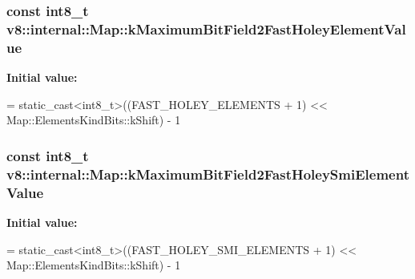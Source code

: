 \subsubsection[{k\+Maximum\+Bit\+Field2\+Fast\+Holey\+Element\+Value}]{\setlength{\rightskip}{0pt plus 5cm}const int8\+\_\+t v8\+::internal\+::\+Map\+::k\+Maximum\+Bit\+Field2\+Fast\+Holey\+Element\+Value\hspace{0.3cm}{\ttfamily [static]}}\label{classv8_1_1internal_1_1_map_a11db99b6b39703668e4a5e184ba80d34}
{\bfseries Initial value\+:}
\begin{DoxyCode}
=
      \textcolor{keyword}{static\_cast<}int8\_t\textcolor{keyword}{>}((FAST\_HOLEY\_ELEMENTS + 1) <<
                          Map::ElementsKindBits::kShift) - 1
\end{DoxyCode}
\hypertarget{classv8_1_1internal_1_1_map_ab1022f42be59932c94f52f22581ea870}{}
\subsubsection[{k\+Maximum\+Bit\+Field2\+Fast\+Holey\+Smi\+Element\+Value}]{\setlength{\rightskip}{0pt plus 5cm}const int8\+\_\+t v8\+::internal\+::\+Map\+::k\+Maximum\+Bit\+Field2\+Fast\+Holey\+Smi\+Element\+Value\hspace{0.3cm}{\ttfamily [static]}}\label{classv8_1_1internal_1_1_map_ab1022f42be59932c94f52f22581ea870}
{\bfseries Initial value\+:}
\begin{DoxyCode}
=
      \textcolor{keyword}{static\_cast<}int8\_t\textcolor{keyword}{>}((FAST\_HOLEY\_SMI\_ELEMENTS + 1) <<
                          Map::ElementsKindBits::kShift) - 1
\end{DoxyCode}
\hypertarget{classv8_1_1internal_1_1_map_a252325defbc9ac4d665ee6a7ef5863f4}{}
